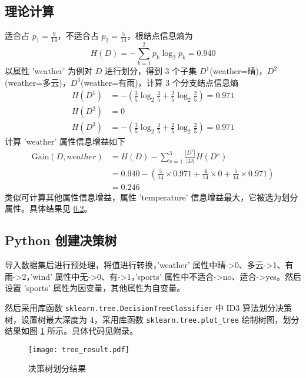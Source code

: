 \documentclass[12pt,AutoFakeBold]{article}
\begin{document}
\subsection{理论计算}

适合占 $p_1=\frac{9}{14}$，不适合占 $p_2=\frac{5}{14}$，根结点信息熵为
%
\begin{equation}
H(D)=-\sum_{k=1}^2p_k\log_2p_k=0.940
\end{equation}
%
以属性 'weather' 为例对 $D$ 进行划分，得到 3 个子集 $D^1$(weather=晴)，$D^2$(weather=多云)，$D^3$(weather=有雨)，计算 3 个分支结点信息熵
%
\begin{equation}
\begin{aligned}
H(D^1) &= -\left(\frac{3}{5}\log_2\frac{3}{5}+\frac{2}{5}\log_2\frac{2}{5}\right) = 0.971 \\
H(D^2) &= 0 \\
H(D^3) &= -\left(\frac{3}{5}\log_2\frac{3}{5}+\frac{2}{5}\log_2\frac{2}{5}\right) = 0.971 
\end{aligned}
\end{equation}
%
计算 'weather' 属性信息增益如下
%
\begin{equation}
\begin{aligned}
\mathrm{Gain}(D,weather) &= H(D) - \sum_{v=1}^{3}\frac{|D^v|}{|D|}H(D^v) \\
 &= 0.940-\left(\frac{5}{14}\times0.971+\frac{4}{14}\times0+\frac{5}{14}\times0.971\right) \\
 &= 0.246 
\end{aligned}
\end{equation}
%
类似可计算其他属性信息增益，属性 'temperature' 信息增益最大，它被选为划分属性。具体结果见 \ref{sec:3.2}。 

\subsection{Python 创建决策树} \label{sec:3.2}

导入数据集后进行预处理，将值进行转换，'weather' 属性中晴->0、多云->1、有雨->2，'wind' 属性中无->0、有->1，'sports' 属性中不适合->no、适合->yes。然后设置 'sports' 属性为因变量，其他属性为自变量。

然后采用库函数 \lstinline[language=Python]|sklearn.tree.DecisionTreeClassifier| 中 ID3 算法划分决策树，设置树最大深度为 4，采用库函数 \lstinline[language=Python]|sklearn.tree.plot_tree| 绘制树图，划分结果如图 \ref{fig:tree_result} 所示。具体代码见附录。

\begin{figure}[htbp]
	\centering
    \texttt{[image: tree\_result.pdf]}
    \caption{决策树划分结果} \label{fig:tree_result}
\end{figure}
\end{document}
